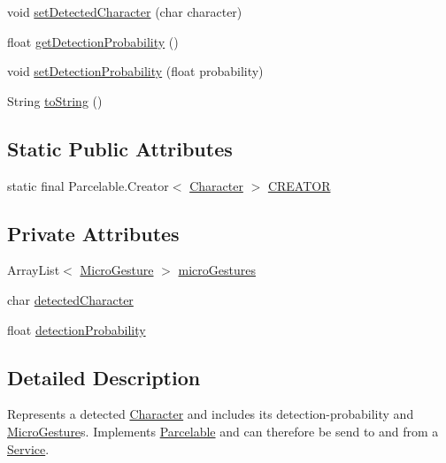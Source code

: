 \begin{DoxyCompactItemize}
\item 
void \hyperlink{classch_1_1zhaw_1_1ba10__bsha__1_1_1Character_aa9e5aa7c1059cddf5ff9ff451a36b74e}{setDetectedCharacter} (char character)
\item 
float \hyperlink{classch_1_1zhaw_1_1ba10__bsha__1_1_1Character_afaae3f56a30c91e7bac95a24501bae6c}{getDetectionProbability} ()
\item 
void \hyperlink{classch_1_1zhaw_1_1ba10__bsha__1_1_1Character_a31e123df91176847469ae4ac0fab3066}{setDetectionProbability} (float probability)
\item 
String \hyperlink{classch_1_1zhaw_1_1ba10__bsha__1_1_1Character_a52e36b4f56fd850f683d0e0e0c3ddf1e}{toString} ()
\end{DoxyCompactItemize}
\subsection*{Static Public Attributes}
\begin{DoxyCompactItemize}
\item 
static final Parcelable.Creator$<$ \hyperlink{classch_1_1zhaw_1_1ba10__bsha__1_1_1Character}{Character} $>$ \hyperlink{classch_1_1zhaw_1_1ba10__bsha__1_1_1Character_a0659f648118f65f0deed3ac7b08bdee1}{CREATOR}
\end{DoxyCompactItemize}
\subsection*{Private Attributes}
\begin{DoxyCompactItemize}
\item 
ArrayList$<$ \hyperlink{classch_1_1zhaw_1_1ba10__bsha__1_1_1service_1_1MicroGesture}{MicroGesture} $>$ \hyperlink{classch_1_1zhaw_1_1ba10__bsha__1_1_1Character_a3a665125fd44a0f4b65330f0dfa72bfe}{microGestures}
\item 
char \hyperlink{classch_1_1zhaw_1_1ba10__bsha__1_1_1Character_ab26dadf317157ee393e6498b03c4c4b2}{detectedCharacter}
\item 
float \hyperlink{classch_1_1zhaw_1_1ba10__bsha__1_1_1Character_af797c21f650fd10789f7c00bda6418c8}{detectionProbability}
\end{DoxyCompactItemize}


\subsection{Detailed Description}
Represents a detected \hyperlink{classch_1_1zhaw_1_1ba10__bsha__1_1_1Character}{Character} and includes its detection-\/probability and \hyperlink{}{MicroGesture}s. Implements \hyperlink{}{Parcelable} and can therefore be send to and from a \hyperlink{}{Service}.

